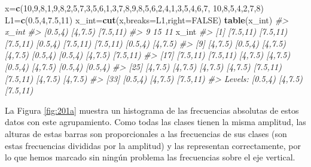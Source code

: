 \documentclass[
]{book}
\newenvironment{Shaded}{\begin{snugshade}}{\end{snugshade}}
\newcommand{\CommentTok}[1]{\textcolor[rgb]{0.56,0.35,0.01}{\textit{#1}}}
\newcommand{\DataTypeTok}[1]{\textcolor[rgb]{0.13,0.29,0.53}{#1}}
\newcommand{\DecValTok}[1]{\textcolor[rgb]{0.00,0.00,0.81}{#1}}
\newcommand{\FloatTok}[1]{\textcolor[rgb]{0.00,0.00,0.81}{#1}}
\newcommand{\KeywordTok}[1]{\textcolor[rgb]{0.13,0.29,0.53}{\textbf{#1}}}
\newcommand{\NormalTok}[1]{#1}
\newcommand{\OtherTok}[1]{\textcolor[rgb]{0.56,0.35,0.01}{#1}}
\theoremstyle{definition}
\theoremstyle{definition}
\theoremstyle{definition}
\theoremstyle{remark}
\begin{document}
\begin{Shaded}
\begin{Highlighting}[]
\NormalTok{x=}\KeywordTok{c}\NormalTok{(}\DecValTok{10}\NormalTok{,}\DecValTok{9}\NormalTok{,}\DecValTok{8}\NormalTok{,}\DecValTok{1}\NormalTok{,}\DecValTok{9}\NormalTok{,}\DecValTok{8}\NormalTok{,}\DecValTok{2}\NormalTok{,}\DecValTok{5}\NormalTok{,}\DecValTok{7}\NormalTok{,}\DecValTok{3}\NormalTok{,}\DecValTok{5}\NormalTok{,}\DecValTok{6}\NormalTok{,}\DecValTok{1}\NormalTok{,}\DecValTok{3}\NormalTok{,}\DecValTok{7}\NormalTok{,}\DecValTok{8}\NormalTok{,}\DecValTok{9}\NormalTok{,}\DecValTok{8}\NormalTok{,}\DecValTok{5}\NormalTok{,}\DecValTok{6}\NormalTok{,}\DecValTok{2}\NormalTok{,}\DecValTok{4}\NormalTok{,}\DecValTok{1}\NormalTok{,}\DecValTok{3}\NormalTok{,}\DecValTok{5}\NormalTok{,}\DecValTok{4}\NormalTok{,}\DecValTok{6}\NormalTok{,}\DecValTok{7}\NormalTok{,}
  \DecValTok{10}\NormalTok{,}\DecValTok{8}\NormalTok{,}\DecValTok{5}\NormalTok{,}\DecValTok{4}\NormalTok{,}\DecValTok{2}\NormalTok{,}\DecValTok{7}\NormalTok{,}\DecValTok{8}\NormalTok{)}
\NormalTok{L1=}\KeywordTok{c}\NormalTok{(}\FloatTok{0.5}\NormalTok{,}\DecValTok{4}\NormalTok{,}\FloatTok{7.5}\NormalTok{,}\DecValTok{11}\NormalTok{)}
\NormalTok{x\_int=}\KeywordTok{cut}\NormalTok{(x,}\DataTypeTok{breaks=}\NormalTok{L1,}\DataTypeTok{right=}\OtherTok{FALSE}\NormalTok{)}
\KeywordTok{table}\NormalTok{(x\_int)}
\CommentTok{\#\textgreater{} x\_int}
\CommentTok{\#\textgreater{}  [0.5,4)  [4,7.5) [7.5,11) }
\CommentTok{\#\textgreater{}        9       15       11}
\NormalTok{x\_int}
\CommentTok{\#\textgreater{}  [1] [7.5,11) [7.5,11) [7.5,11) [0.5,4)  [7.5,11) [7.5,11) [0.5,4)  [4,7.5) }
\CommentTok{\#\textgreater{}  [9] [4,7.5)  [0.5,4)  [4,7.5)  [4,7.5)  [0.5,4)  [0.5,4)  [4,7.5)  [7.5,11)}
\CommentTok{\#\textgreater{} [17] [7.5,11) [7.5,11) [4,7.5)  [4,7.5)  [0.5,4)  [4,7.5)  [0.5,4)  [0.5,4) }
\CommentTok{\#\textgreater{} [25] [4,7.5)  [4,7.5)  [4,7.5)  [4,7.5)  [7.5,11) [7.5,11) [4,7.5)  [4,7.5) }
\CommentTok{\#\textgreater{} [33] [0.5,4)  [4,7.5)  [7.5,11)}
\CommentTok{\#\textgreater{} Levels: [0.5,4) [4,7.5) [7.5,11)}
\end{Highlighting}
\end{Shaded}

La Figura \ref{fig:201a} muestra un histograma de las frecuencias absolutas de estos datos con este agrupamiento.
Como todas las clases tienen la misma amplitud, las alturas de estas barras son proporcionales a las frecuencias de sus clases (son estas frecuencias divididas por la amplitud) y las representan correctamente, por lo que hemos marcado sin ningún problema las frecuencias sobre el eje vertical.
\end{document}
